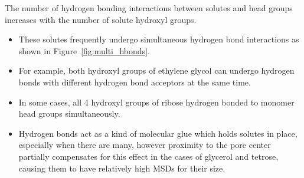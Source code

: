 \documentclass{article}
\begin{document}
  The number of hydrogen bonding interactions between solutes and head groups
  increases with the number of solute hydroxyl groups.
  \begin{itemize}
    \item These solutes frequently undergo simultaneous hydrogen bond interactions as
    shown in Figure~\ref{fig:multi_hbonds}. 
    \item For example, both hydroxyl groups of ethylene glycol can undergo hydrogen
    bonds with different hydrogen bond acceptors at the same time.
    \item In some cases, all 4 hydroxyl groups of ribose hydrogen bonded to monomer
    head groups simultaneously.
    \item Hydrogen bonds act as a kind of molecular glue which holds solutes in place, 
    especially when there are many, however proximity to the pore center partially 
    compensates for this effect in the cases of glycerol and tetrose, causing them to
    have relatively high MSDs for their size.
  \end{itemize}
  
\end{document}
